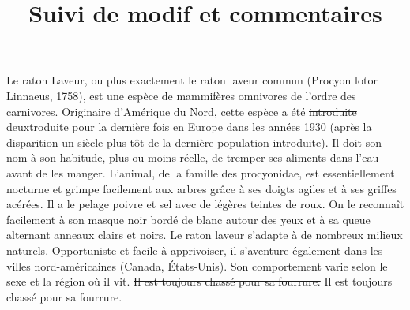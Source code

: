 \documentclass[10pt,a4paper]{article}
\title{Suivi de modif et commentaires}
\begin{document}
\newcommand\commentLudo[1]{}
\newcommand\modifBob[2]{ {\color{red} \sout{#1} } { \color{green} #2} }

\maketitle

Le raton Laveur, ou plus exactement le raton laveur commun (Procyon lotor Linnaeus, 1758), est une espèce de mammifères omnivores de l'ordre des carnivores. \commentLudo{Je suis contre !}
Originaire d’Amérique du Nord, cette espèce a été \modifBob{introduite}{deuxtroduite} pour la dernière fois en Europe dans les années 1930 (après la disparition un siècle plus tôt de la dernière population introduite).  \commentLudo{Je suis contre !}
Il doit son nom à son habitude, plus ou moins réelle, de tremper ses aliments dans l’eau avant de les manger.  \commentLudo{Je suis contre !}
L’animal, de la famille des procyonidae, est essentiellement nocturne et grimpe facilement aux arbres grâce à ses doigts agiles et à ses griffes acérées. Il a le pelage poivre et sel avec de légères teintes de roux. 
On le reconnaît facilement à son masque noir bordé de blanc autour des yeux et à sa queue alternant anneaux clairs et noirs. 
Le raton laveur s’adapte à de nombreux milieux naturels. 
Opportuniste et facile à apprivoiser, il s’aventure également dans les villes nord-américaines (Canada, États-Unis). 
Son comportement varie selon le sexe et la région où il vit. 
\modifBob{Il est toujours chassé pour sa fourrure.}{Il est toujours chassé pour sa fourrure.}
\end{document}
